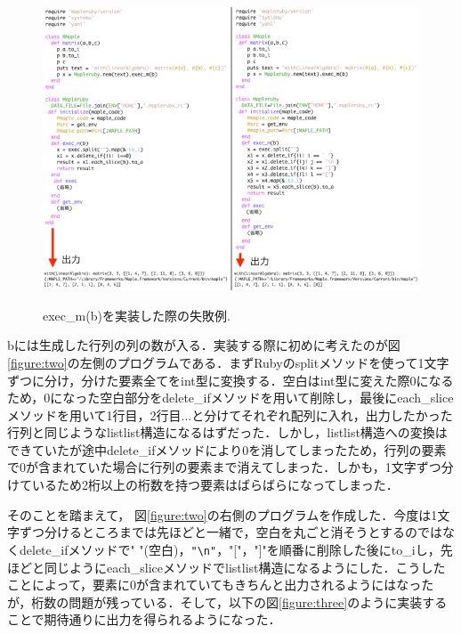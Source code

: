 \documentclass[10pt,a4j]{article}
\begin{document}
\begin{figure}[htbp]\begin{center}
\includegraphics[width=12cm,bb= 0 0 937 753]{../figs/./mapleruby_eringi.004.png}
\caption{exec\_m(b)を実装した際の失敗例.}
\label{figure:two}
\label{default}\end{center}\end{figure}
bには生成した行列の列の数が入る．実装する際に初めに考えたのが図\ref{figure:two}の左側のプログラムである．まずRubyのsplitメソッドを使って1文字ずつに分け，分けた要素全てをint型に変換する．空白はint型に変えた際0になるため，0になった空白部分をdelete\_ifメソッドを用いて削除し，最後にeach\_sliceメソッドを用いて1行目，2行目...と分けてそれぞれ配列に入れ，出力したかった行列と同じようなlistlist構造になるはずだった．しかし，listlist構造への変換はできていたが途中delete\_ifメソッドにより0を消してしまったため，行列の要素で0が含まれていた場合に行列の要素まで消えてしまった．しかも，1文字ずつ分けているため2桁以上の桁数を持つ要素はばらばらになってしまった．

そのことを踏まえて， 図\ref{figure:two}の右側のプログラムを作成した．今度は1文字ずつ分けるところまでは先ほどと一緒で，空白を丸ごと消そうとするのではなくdelete\_ifメソッドで" "(空白)，\verb|"\n"|，"["，"]"を順番に削除した後にto\_iし，先ほどと同じようにeach\_sliceメソッドでlistlist構造になるようにした．こうしたことによって，要素に0が含まれていてもきちんと出力されるようにはなったが，桁数の問題が残っている．そして，以下の図\ref{figure:three}のように実装することで期待通りに出力を得られるようになった．
\end{document}
